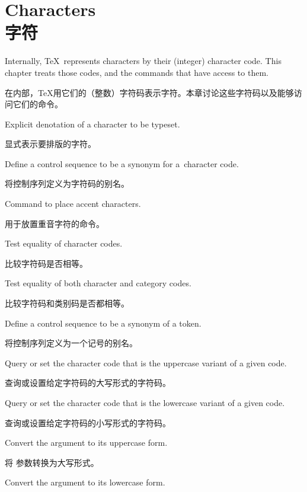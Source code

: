 
\endofchapter
\chapter{Characters\\字符}\label{char}

Internally, \TeX\ represents characters by their (integer) 
character code. This chapter treats those codes, and the
commands that have access to them.

在内部，\TeX 用它们的（整数）字符码表示字符。本章讨论这些字符码以及能够访问它们的命令。

\begin{inventory}
\item [\cs{char}]
      Explicit denotation of a character to be typeset. 

      显式表示要排版的字符。
\item [\cs{chardef}] 
      Define a control sequence to be a synonym for
      a~character code.

      将控制序列定义为字符码的别名。
\item [\cs{accent}] 
      Command to place accent characters.

      用于放置重音字符的命令。
\item [\cs{if}]
      Test equality of character codes. 

      比较字符码是否相等。
\item [\cs{ifx}]
      Test equality of both character and category codes.

      比较字符码和类别码是否都相等。
\item [\cs{let}]
      Define a control sequence to be a synonym of a token.

      将控制序列定义为一个记号的别名。
\item [\cs{uccode}] 
      Query or set
      the character code that is the uppercase variant of a given code.

      查询或设置给定字符码的大写形式的字符码。
\item [\cs{lccode}]
      Query or set
      the character code that is the lowercase variant of a given code.

      查询或设置给定字符码的小写形式的字符码。
\item [\cs{uppercase}]
      Convert the  argument to its uppercase form.

      将  参数转换为大写形式。
\item [\cs{lowercase}] 
      Convert the  argument to its lowercase form.


\end{inventory}

